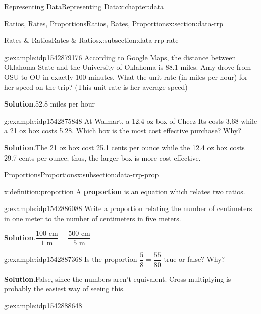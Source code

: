 \documentclass[oneside,10pt,]{book}
\newcommand{\blocktitlefont}{\relax}
\newcommand{\terminology}[1]{\textbf{#1}}
\begin{document}
\begin{chapterptx}{Representing Data}{}{Representing Data}{}{}{x:chapter:data}
\begin{sectionptx}{Ratios, Rates, Proportions}{}{Ratios, Rates, Proportions}{}{}{x:section:data-rrp}
\begin{subsectionptx}{Rates \& Ratios}{}{Rates \& Ratios}{}{}{x:subsection:data-rrp-rate}
\begin{example}{}{g:example:idp1542879176}
According to Google Maps, the distance between Oklahoma State and the University of Oklahoma is 88.1 miles.  Amy drove from OSU to OU in exactly 100 minutes.  What the unit rate (in miles per hour) for her speed on the trip? (This unit rate is her average speed)%
\par\smallskip%
\noindent\textbf{\blocktitlefont Solution}.\hypertarget{g:solution:idp1542881736}{}\quad{}52.8 miles per hour%
\end{example}
\begin{example}{}{g:example:idp1542875848}%
At Walmart, a 12.4 oz box of Cheez-Its costs \textdollar{}3.68 while a 21 oz box costs \textdollar{}5.28.  Which box is the most cost effective purchase?  Why?%
\par\smallskip%
\noindent\textbf{\blocktitlefont Solution}.\hypertarget{g:solution:idp1542879560}{}\quad{}The 21 oz box cost 25.1 cents per ounce while the 12.4 oz box costs 29.7 cents per ounce; thus, the larger box is more cost effective.%
\end{example}
\end{subsectionptx}
%
%
\typeout{************************************************}
\typeout{************************************************}
%
\begin{subsectionptx}{Proportions}{}{Proportions}{}{}{x:subsection:data-rrp-prop}
\begin{definition}{}{x:definition:proportion}%
A \terminology{proportion} is an equation which relates two ratios.%
%
\end{definition}
\begin{example}{}{g:example:idp1542886088}%
Write a proportion relating the number of centimeters in one meter to the number of centimeters in five meters.%
\par\smallskip%
\noindent\textbf{\blocktitlefont Solution}.\hypertarget{g:solution:idp1542889032}{}\quad{}\(\dfrac{100\text{ cm}}{1\text{ m}} = \dfrac{500\text{ cm}}{5\text{ m}}\)%
\end{example}
\begin{example}{}{g:example:idp1542887368}%
Is the proportion \(\dfrac{5}{8} = \dfrac{55}{80}\) true or false?  Why?%
\par\smallskip%
\noindent\textbf{\blocktitlefont Solution}.\hypertarget{g:solution:idp1542885576}{}\quad{}False, since the numbers aren't equivalent.  Cross multiplying is probably the easiest way of seeing this.%
\end{example}
\begin{example}{}{g:example:idp1542888648}%

\end{example}
\end{subsectionptx}
\end{sectionptx}
\end{chapterptx}
\end{document}

